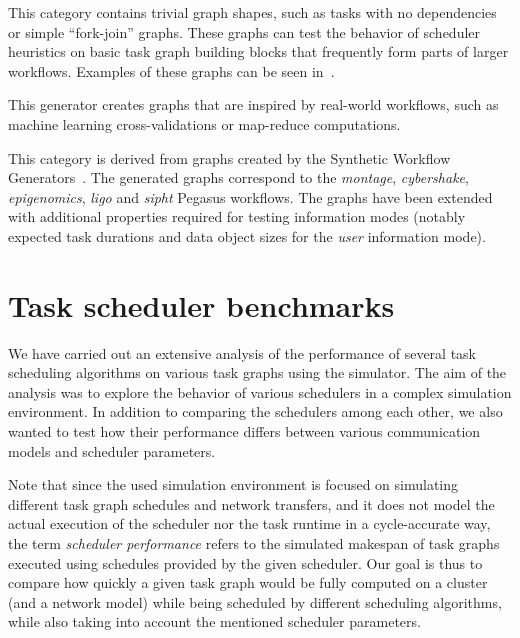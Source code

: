 \begin{description}[wide=0pt]
	\item[elementary] This category contains trivial graph shapes, such as tasks with no dependencies or simple
		``fork-join'' graphs. These graphs can test the behavior of scheduler heuristics on basic task
		graph building blocks that frequently form parts of larger workflows. Examples of these graphs can
		be seen in~.

	\item[irw] This generator creates graphs that are inspired by real-world workflows, such as machine learning
		cross-validations or map-reduce computations.

	\item[pegasus] This category is derived from graphs created by the Synthetic Workflow
		Generators~\cite{pegasusgraphs}. The generated graphs correspond to the \emph{montage},
		\emph{cybershake}, \emph{epigenomics}, \emph{ligo} and \emph{sipht}
		Pegasus workflows. The graphs have been extended with additional properties required for testing
		information modes (notably expected task durations and data object sizes for the
		\emph{user} information mode).
\end{description}

\section{Task scheduler benchmarks}
\label{sec:estee-benchmarks}
We have carried out an extensive analysis of the performance of several task scheduling algorithms on
various task graphs using the \estee{} simulator. The aim of the analysis was to
explore the behavior of various schedulers in a complex simulation environment. In addition to
comparing the schedulers among each other, we also wanted to test how their performance
differs between various communication models and scheduler parameters.

Note that since the used simulation environment is focused on simulating different task graph
schedules and network transfers, and it does not model the actual execution of the scheduler nor
the task runtime in a cycle-accurate way, the term \emph{scheduler performance} refers to the simulated
makespan of task graphs executed using schedules provided by the given scheduler. Our goal is thus
to compare how quickly a given task graph would be fully computed on a cluster (and a network
model) while being scheduled by different scheduling algorithms, while also taking into account the
mentioned scheduler parameters.

